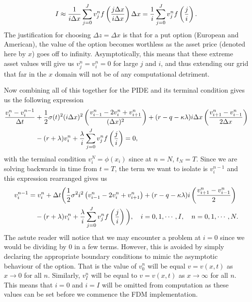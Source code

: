 	\begin{equation}
		\label{eqn:intDiscrete}
		I \approx \frac{1}{i\Delta x}\sum\limits_{j=0}^J v_j^n f\left( \frac{j\Delta x}{i \Delta x} \right) \Delta x = \frac{1}{i}\sum\limits_{j=0}^J v_j^n f\left( \frac{j}{i} \right).
	\end{equation}
The justification for choosing $\Delta z = \Delta x$ is that for a put option (European and American), the value of the option becomes worthless as the asset price (denoted here by $x$) goes off to infinity. Asymptotically, this means that these extreme asset values will give us $v_j^n = v_i^n = 0$ for large $j$ and $i$, and thus extending our grid that far in the $x$ domain will not be of any computational detriment. 

Now combining all of this together for the PIDE and its terminal condition gives us the following expression
	\begin{equation*}
		\begin{split}
		\frac{v_i^n - v_i^{n-1}}{\Delta t} &+ \frac{1}{2}\sigma(t)^2(i\Delta x)^2\left(  \frac{v_{i-1}^n - 2v_i^n + v_{i+1}^n}{(\Delta x)^2} \right) + (r-q-\kappa\lambda)i\Delta x \left( \frac{ v_{i+1}^n - v_{i-1}^n}{2\Delta x} \right) \\
		&- (r+\lambda)v_i^n + \frac{\lambda}{i}\sum\limits_{j=0}^J v_j^n f\left( \frac{j}{i} \right) = 0,
			\end{split}
	\end{equation*}
with the terminal condition $v_i^N = \phi(x_i)$ since at $n=N$, $t_N = T$. Since we are solving backwards in time from $t=T$, the term we want to isolate is $v_i^{n-1}$ and this expression rearranged gives us
		\begin{equation}
		\label{eqn:FDMPIDE}
		\begin{split}
		v_i^{n-1} &= v_i^n + \Delta t \bigg( \frac{1}{2}\sigma^2i^2\left(  v_{i-1}^n - 2v_i^n + v_{i+1}^n \right) + (r-q-\kappa\lambda)i \left( \frac{ v_{i+1}^n - v_{i-1}^n}{2} \right) \\
		&\quad{} - (r+\lambda)v_i^n + \frac{\lambda}{i}\sum\limits_{j=0}^J v_j^n f\left( \frac{j}{i} \right) \bigg),  \quad i = 0,1,\cdots,I, \quad n = 0,1,\cdots,N.
			\end{split}
	\end{equation}
The astute reader will notice that we may encounter a problem at $i=0$ since we would be dividing by 0 in a few terms. However, this is avoided by simply declaring the appropriate boundary conditions to mimic the asymptotic behaviour of the option. That is the value of $v_0^n$ will be equal $v = v(x,t)$ as $x \rightarrow 0$ for all $n$. Similarly, $v_I^n$ will be equal to $v = v(x,t)$ as $x \rightarrow \infty$ for all $n$. This means that $i=0$ and $i=I$ will be omitted from computation as these values can be set before we commence the FDM implementation.

